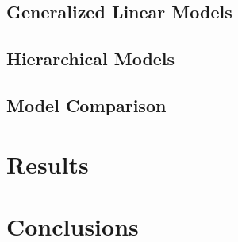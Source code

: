\documentclass{IEEEtran}
\begin{document}
\subsection{Generalized Linear Models}

\subsection{Hierarchical Models}

\subsection{Model Comparison}

\section{Results}

\section{Conclusions}
\end{document}
